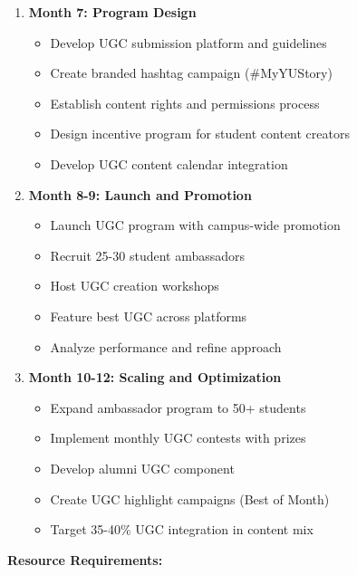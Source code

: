 \documentclass[12pt]{report}
\begin{document}
\begin{enumerate}
\item \textbf{Month 7: Program Design}
\begin{itemize}
\item Develop UGC submission platform and guidelines
\item Create branded hashtag campaign (\#MyYUStory)
\item Establish content rights and permissions process
\item Design incentive program for student content creators
\item Develop UGC content calendar integration
\end{itemize}

\item \textbf{Month 8-9: Launch and Promotion}
\begin{itemize}
\item Launch UGC program with campus-wide promotion
\item Recruit 25-30 student ambassadors
\item Host UGC creation workshops
\item Feature best UGC across platforms
\item Analyze performance and refine approach
\end{itemize}

\item \textbf{Month 10-12: Scaling and Optimization}
\begin{itemize}
\item Expand ambassador program to 50+ students
\item Implement monthly UGC contests with prizes
\item Develop alumni UGC component
\item Create UGC highlight campaigns (Best of Month)
\item Target 35-40\% UGC integration in content mix
\end{itemize}
\end{enumerate}

\textbf{Resource Requirements:}
\end{document}
